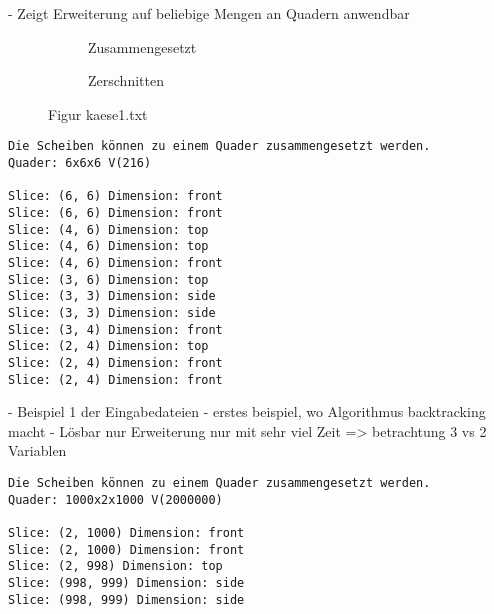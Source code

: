 \documentclass[a4paper,10pt,ngerman]{scrartcl}
\newcommand{\simplecube}[8]%
{
    \begin{scope}[shift={#1}]
        \fill[gray!40,canvas is yz plane at x=#2, opacity=#8] (0,0) rectangle (#3,#4);
        \fill[gray!10,canvas is xz plane at y=#3, opacity=#8] (0,0) rectangle (#2,#4);
        \fill[white  ,canvas is xy plane at z=#4, opacity=#8] (0,0) rectangle (#2,#3);
        \foreach\i/\j in {0/1, 1/1, 1/0}
            {
            \draw[line#5] (0,#3*\i,#4*\j) --++ (#2,0,0);
            \draw[line#6] (#2*\i,0,#4*\j) --++ (0,#3,0);
            \draw[line#7] (#2*\i,#3*\j,0) --++ (0,0,#4);
        }
    \end{scope}
}
\newcommand{\bigSquare}[4]%
{
    \begin{scope}[shift={#1}]
        \simplecube{(0,     0,      0)}     {1}{4}{2}   {a}{a}{a}   {1}
        \simplecube{(1+#4,   0,      0))}    {1}{4}{2}   {a}{a}{a}   {1}
        \simplecube{(0,     0,      2+#4)}   {2}{4}{1}   {a}{a}{a}   {1}
        \simplecube{(2+2*#4,   0,      0)}     {1}{4}{3}   {a}{a}{a}   {0.8}
        \simplecube{(0,     4+#4,    0)}     {3}{1}{3}   {a}{a}{a}   {0.8}
        \simplecube{(0,     5+2*#4,    0)}     {3}{1}{3}   {a}{a}{a}   {0.5}
        \simplecube{(0,     0,      3+2*#4)}   {3}{6}{1}   {a}{a}{a}   {0.8}
        \simplecube{(3+3*#4,   0,      0))}    {1}{6}{4}   {a}{a}{a}   {0.5}
        \simplecube{(0,     0,      4+3*#4)}   {4}{6}{1}   {a}{a}{a}   {0.5}
        \simplecube{(0,     0,      5+4*#4)}   {4}{6}{1}   {a}{a}{a}   {0.2}
        \simplecube{(4+4*#4,   0,      0))}    {1}{6}{6}   {a}{a}{a}   {0.2}
        \simplecube{(5+5*#4,   0,      0))}    {1}{6}{6}   {a}{a}{a}   {0}
    \end{scope}
}
\begin{document}
    - Zeigt Erweiterung auf beliebige Mengen an Quadern anwendbar

    \newpage

    \begin{figure}[H]
        \centering
        \def\a{3.2}
        \def\b{1.2}
        \begin{subfigure}[b]{0.45\textwidth}
            \centering %
            \caption{Zusammengesetzt}\label{fig:figA1}
        \end{subfigure}
        \begin{subfigure}[b]{0.45\textwidth}
            \centering %
            \caption{Zerschnitten}\label{fig:figB1}
        \end{subfigure}
        \caption{Figur kaese1.txt}\label{fig:figAB1}
    \end{figure}

    \begin{lstlisting}[frame=single, title=Programmausgabe kaese1.txt, breaklines=true,label={lst:lstlisting6}]
    Die Scheiben können zu einem Quader zusammengesetzt werden.
Quader: 6x6x6 V(216)

Slice: (6, 6) Dimension: front
Slice: (6, 6) Dimension: front
Slice: (4, 6) Dimension: top
Slice: (4, 6) Dimension: top
Slice: (4, 6) Dimension: front
Slice: (3, 6) Dimension: top
Slice: (3, 3) Dimension: side
Slice: (3, 3) Dimension: side
Slice: (3, 4) Dimension: front
Slice: (2, 4) Dimension: top
Slice: (2, 4) Dimension: front
Slice: (2, 4) Dimension: front

    \end{lstlisting}

    - Beispiel 1 der Eingabedateien
    - erstes beispiel, wo Algorithmus backtracking macht
    - Lösbar nur Erweiterung nur mit sehr viel Zeit
        => betrachtung 3 vs 2 Variablen

    \begin{lstlisting}[frame=single, title=Programmausgabe kaese2.txt, breaklines=true,label={lst:lstlisting7}]
Die Scheiben können zu einem Quader zusammengesetzt werden.
Quader: 1000x2x1000 V(2000000)

Slice: (2, 1000) Dimension: front
Slice: (2, 1000) Dimension: front
Slice: (2, 998) Dimension: top
Slice: (998, 999) Dimension: side
Slice: (998, 999) Dimension: side

    \end{lstlisting}
\end{document}
